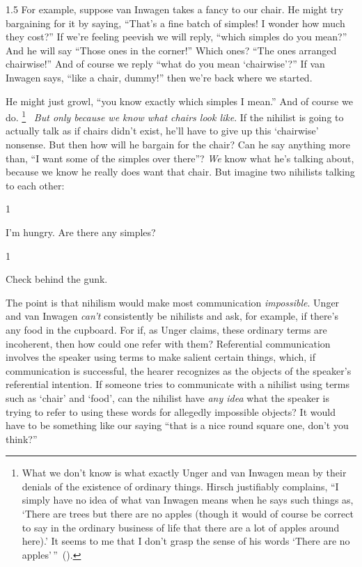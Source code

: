 \documentclass[11pt]{article}
\newcommand{\stage}[3]%
{%
	\begin{spacing}{1}%
	\vspace{0pt}
		\begin{description}[style=nextline, parsep=0pt, leftmargin=15mm, itemindent=-10mm, font=\mdseries]
			\item[\textsc{#1} \emph{#2}] #3
		\end{description}%
	\end{spacing}%
}
\begin{document}
\begin{spacing}{1.5}
For example, suppose van Inwagen takes a fancy to our chair. He might try bargaining for it by saying, ``That's a fine batch of simples! I wonder how much they cost?'' If we're feeling peevish we will reply, ``which simples do you mean?'' And he will say ``Those ones in the corner!'' Which ones? ``The ones arranged chairwise!'' And of course we reply ``what do you mean `chairwise'?'' If van Inwagen says, ``like a chair, dummy!'' then we're back where we started.

He might just growl, ``you know exactly which simples I mean.'' And of course we do.%
%
\footnote{What we don't know is what exactly Unger and van Inwagen mean by their denials of the existence of ordinary things. Hirsch justifiably complains, ``I simply have no idea of what van Inwagen means when he says such things as, `There are trees but there are no apples (though it would of course be correct to say in the ordinary business of life that there are a lot of apples around here).' It seems to me that I don't grasp the sense of his words `There are no apples'\,''~(\citeyear[690]{hirsch1993}).}%
%
\ {\em But only because we know what chairs look like}. If the nihilist is going to actually talk as if chairs didn't exist, he'll have to give up this `chairwise' nonsense. But then how will he bargain for the chair? Can he say anything more than, ``I want some of the simples over there''? {\em We} know what he's talking about, because we know he really does want that chair. But imagine two nihilists talking to each other:

\stage{Unger}{}{I'm hungry. Are there any simples?}
\stage{van Inwagen}{}{Check behind the gunk.}

The point is that nihilism would make most communication {\em impossible}. Unger and van Inwagen {\em can't} consistently be nihilists and ask, for example, if there's any food in the cupboard. For if, as Unger claims, these ordinary terms are incoherent, then how could one refer with them? Referential communication involves the speaker using terms to make salient certain things, which, if communication is successful, the hearer recognizes as the objects of the speaker's referential intention. If someone tries to communicate with a nihilist using terms such as `chair' and `food', can the nihilist have {\em any idea} what the speaker is trying to refer to using these words for allegedly impossible objects? It would have to be something like our saying ``that is a nice round square one, don't you think?''%
%


\end{spacing}
\end{document}
